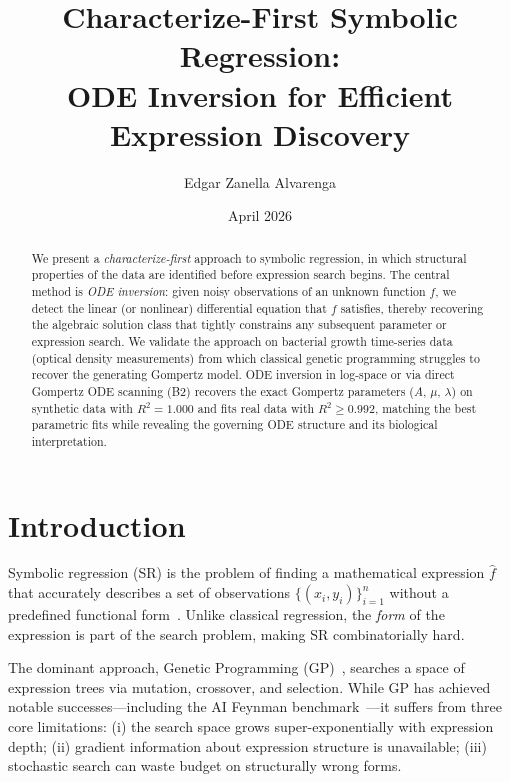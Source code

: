 \documentclass[11pt,a4paper]{article}
\title{Characterize-First Symbolic Regression:\\
ODE Inversion for Efficient Expression Discovery}
\author{Edgar Zanella Alvarenga}
\date{April 2026}
\begin{document}
\maketitle

\begin{abstract}
We present a \emph{characterize-first} approach to symbolic regression, in which structural
properties of the data are identified before expression search begins. The central method is
\emph{ODE inversion}: given noisy observations of an unknown function $f$, we detect the
linear (or nonlinear) differential equation that $f$ satisfies, thereby recovering the
algebraic solution class that tightly constrains any subsequent parameter or expression search.
We validate the approach on bacterial growth time-series data (optical density measurements)
from which classical genetic programming struggles to recover the generating Gompertz model.
ODE inversion in log-space or via direct Gompertz ODE scanning (B2) recovers the exact
Gompertz parameters ($A$, $\mu$, $\lambda$) on synthetic data with $R^2=1.000$ and fits
real data with $R^2 \geq 0.992$, matching the best parametric fits while revealing the
governing ODE structure and its biological interpretation.
\end{abstract}

\section{Introduction}
\label{sec:intro}

Symbolic regression (SR) is the problem of finding a mathematical expression $\hat{f}$ that
accurately describes a set of observations $\{(x_i, y_i)\}_{i=1}^n$ without a predefined
functional form~\cite{koza1992}. Unlike classical regression, the \emph{form} of the expression
is part of the search problem, making SR combinatorially hard.

The dominant approach, Genetic Programming (GP)~\cite{koza1992}, searches a space of expression
trees via mutation, crossover, and selection. While GP has achieved notable successes—including
the AI Feynman benchmark~\cite{udrescu2020}—it suffers from three core limitations:
(i) the search space grows super-exponentially with expression depth;
(ii) gradient information about expression structure is unavailable;
(iii) stochastic search can waste budget on structurally wrong forms.
\end{document}
